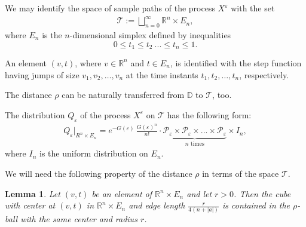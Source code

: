 \documentclass[12pt]{article}
\newcommand\D{\mathbb D}
\let\ep\varepsilon
\newcommand\PP{\mathcal P}
\newcommand\ro{\rho}
\newcommand{\R}{\mathbb{R}}
\newcommand\TT{\mathcal T}
\let\le\leqslant
\newtheorem{lemma}[theorem]{Lemma}
\theoremstyle{definition}
\begin{document}
We may identify the space of sample paths of the process $X^\ep$ with the set 
\begin{equation*}
            \begin{gathered}
                \TT := \bigsqcup_{n = 0}^{\infty} \R^n\times E_n,
            \end{gathered}
\end{equation*}
where $E_n$ is the $n$-dimensional simplex defined by inequalities
\[
   0 \le t_1 \le t_2 \ ...\le t_n \le 1.
\]
    
An element $(v, t)$, where $v\in \R^n$ and $t \in E_n$, is identified with the step function having
jumps of size $v_1, v_2, \dots, v_n$ at the time instants $t_1, t_2, \dots, t_n$,
respectively.

The distance $\ro$ can be naturally transferred from $\D$ to $\TT$, too.
        
The distribution $Q_\ep$ of the process $X^\ep$ on $\TT$ has the following form:
\begin{equation*}
            \begin{gathered}
                Q_\ep|_{R^n \times E_n} 
                = e^{-G(\ep)} \, \frac{G(\ep)^n}{n!} \cdot \underbrace{\PP_\ep \times \PP_\ep \times ... \times \PP_\ep}_\text{$n$ times} \times I_n,
            \end{gathered}
\end{equation*}
where $I_n$ is the uniform distribution on $E_n$.
\medskip

We will need the following property of the distance $\ro$ in terms of the space $\TT$.

\begin{lemma}\label{sublemma}
    Let $(v, t)$ be an element of $\R^n\times E_n$ and let $r>0$. Then the cube with center 
    at $(v,t)$ in $\R^n\times E_n$ and edge length $\tfrac{r}{4(n + |a|)}$ is contained in the 
    $\ro$-ball with the same center and radius $r$.
\end{lemma}
\end{document}
